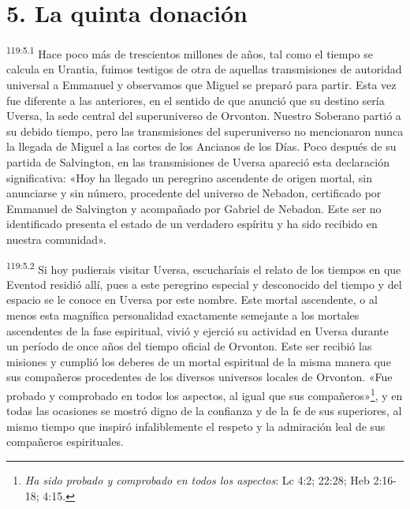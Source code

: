 \section*{5. La quinta donación}
\par
\textsuperscript{119:5.1} Hace poco más de trescientos millones de años, tal como el tiempo se calcula en Urantia, fuimos testigos de otra de aquellas transmisiones de autoridad universal a Emmanuel y observamos que Miguel se preparó para partir. Esta vez fue diferente a las anteriores, en el sentido de que anunció que su destino sería Uversa, la sede central del superuniverso de Orvonton. Nuestro Soberano partió a su debido tiempo, pero las transmisiones del superuniverso no mencionaron nunca la llegada de Miguel a las cortes de los Ancianos de los Días. Poco después de su partida de Salvington, en las transmisiones de Uversa apareció esta declaración significativa: «Hoy ha llegado un peregrino ascendente de origen mortal, sin anunciarse y sin número, procedente del universo de Nebadon, certificado por Emmanuel de Salvington y acompañado por Gabriel de Nebadon. Este ser no identificado presenta el estado de un verdadero espíritu y ha sido recibido en nuestra comunidad».

\par
\textsuperscript{119:5.2} Si hoy pudierais visitar Uversa, escucharíais el relato de los tiempos en que Eventod residió allí, pues a este peregrino especial y desconocido del tiempo y del espacio se le conoce en Uversa por este nombre. Este mortal ascendente, o al menos esta magnífica personalidad exactamente semejante a los mortales ascendentes de la fase espiritual, vivió y ejerció su actividad en Uversa durante un período de once años del tiempo oficial de Orvonton. Este ser recibió las misiones y cumplió los deberes de un mortal espiritual de la misma manera que sus compañeros procedentes de los diversos universos locales de Orvonton. «Fue probado y comprobado en todos los aspectos, al igual que sus compañeros»\footnote{\textit{Ha sido probado y comprobado en todos los aspectos}: Lc 4:2; 22:28; Heb 2:16-18; 4:15.}, y en todas las ocasiones se mostró digno de la confianza y de la fe de sus superiores, al mismo tiempo que inspiró infaliblemente el respeto y la admiración leal de sus compañeros espirituales.

